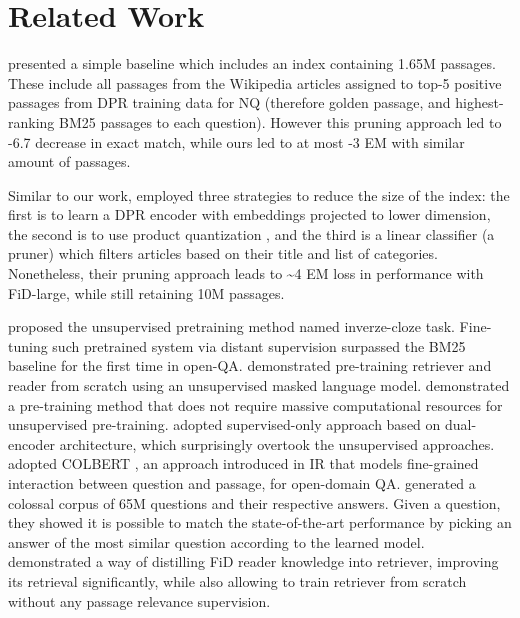 \documentclass[11pt,a4paper]{article}
\begin{document}
\section{Related Work}
\begin{description}[style=unboxed,leftmargin=0em,listparindent=\parindent,parsep=0pt,]
\item[Pruning the document space.]




\citet{min2021neurips} presented a simple baseline which includes an index containing 1.65M passages. 
These include all passages from the Wikipedia articles assigned to top-5 positive passages from DPR training data for NQ \cite{karpukhin2020dense} (therefore golden passage, and highest-ranking BM25 passages to each question). 
However this pruning approach led to -6.7 decrease in exact match, while ours led to at most -3 EM with similar amount of passages.

Similar to our work, \citet{izacard2020memory} employed three strategies to reduce the size of the index: the first is to learn a DPR encoder with embeddings projected to lower dimension, the second is to use product quantization \cite{gray1998quantization}, and the third is a linear classifier (a pruner) which filters articles based on their title and list of categories. 
Nonetheless, their pruning approach leads to \textasciitilde 4 EM loss in performance with FiD-large, while still retaining 10M passages.


\item[Dense retrieval.]
\citet{lee-etal-2019-latent} proposed the unsupervised pretraining method named inverze-cloze task. 
Fine-tuning such pretrained system via distant supervision surpassed the BM25 baseline for the first time in open-QA. 
\citet{guu2020realm} demonstrated pre-training retriever and reader from scratch using an unsupervised masked language model. 
\citet{xiong2020progressively} demonstrated a pre-training method that does not require massive computational resources for unsupervised pre-training. 
\citet{karpukhin2020dense} adopted supervised-only approach based on dual-encoder architecture, which surprisingly overtook the unsupervised approaches. 
\citet{khattab2020relevance} adopted COLBERT \cite{khattab2020colbert}, an approach introduced in IR that models fine-grained interaction between question and passage, for open-domain QA. \citet{lewis2021paq} generated a colossal corpus of 65M questions and their respective answers. 
Given a question, they showed it is possible to match the state-of-the-art performance by picking an answer of the most similar question according to the learned model. 
\citet{izacard2020distilling} demonstrated a way of distilling FiD reader knowledge into retriever, improving its retrieval significantly, while also allowing to train retriever from scratch without any passage relevance supervision.


\end{description}
\end{document}

